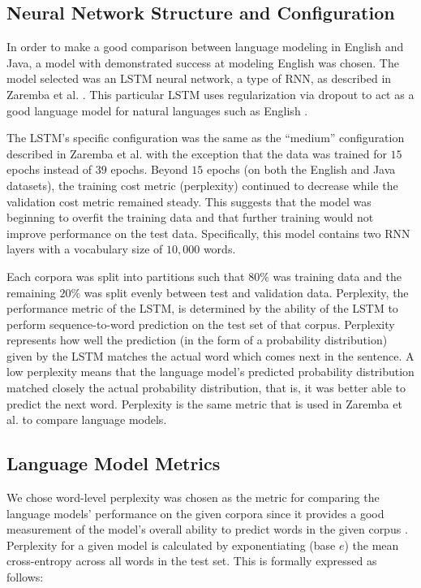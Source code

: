 \documentclass[runningheads,a4paper]{llncs}
\begin{document}
\subsection{Neural Network Structure and Configuration}

In order to make a good comparison between language modeling in English
and Java, a model with demonstrated success at modeling English was
chosen. The model selected was an LSTM neural
network, a type of RNN, as described in
Zaremba et al. \cite{Zaremba}. This particular LSTM uses regularization via 
dropout to act as a good language model for natural languages
such as English \cite{Zaremba}.

The LSTM's specific configuration was the same as the ``medium''
configuration described in Zaremba et al. \cite{Zaremba} with the exception
that the data was trained for $15$ epochs instead of $39$ epochs.
Beyond $15$ epochs (on both the English and Java datasets), the 
training cost metric (perplexity) continued to decrease while the
validation cost metric remained steady. This suggests that the model
was beginning to overfit the training data and that further training
would not improve performance on the test data.
Specifically, this model contains two RNN layers with a vocabulary
size of $10,000$ words.

Each corpora was split into partitions such that $80\%$ was training data
and the remaining $20\%$ was split evenly between test and validation
data. Perplexity, the performance metric of the LSTM, is determined by the
ability of the LSTM to perform sequence-to-word prediction on the test
set of that corpus. Perplexity represents how well the prediction (in the
form of a probability distribution) given by the LSTM matches the actual
word which comes next in the sentence. A low perplexity means that the
language model's predicted probability distribution matched closely the
actual probability distribution, that is, it was better able to predict
the next word. Perplexity is the same metric that is used in
Zaremba et al. \cite{Zaremba} to compare language models.

\subsection{Language Model Metrics}

We chose word-level perplexity was chosen as the metric for comparing the
language models' performance on the given corpora since it provides
a good measurement of the model's overall ability to predict words
in the given corpus \cite{sundermeyer2015feedforward}. 
Perplexity for a given model is calculated
by exponentiating (base $e$) the mean
cross-entropy across all words in the test set. This is formally
expressed as follows:
\end{document}
